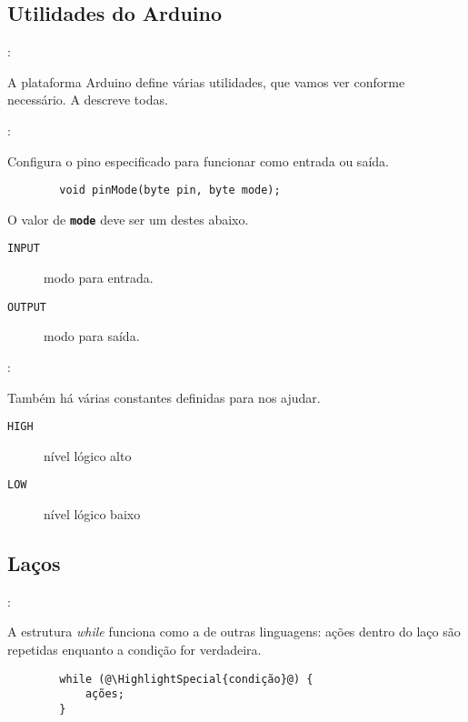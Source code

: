 \subsection{Utilidades do Arduino}


\begin{frame}{\insertsection: \insertsubsection}

	A plataforma Arduino define várias utilidades, que vamos ver conforme necessário. A  descreve todas.

\end{frame}


\begin{frame}[fragile]{\insertsection: \insertsubsection}

	Configura o pino especificado para funcionar como entrada ou saída.
	\begin{verbatim}
		void pinMode(byte pin, byte mode);
	\end{verbatim}

	O valor de \texttt{\textbf{mode}} deve ser um destes abaixo.
	\begin{description}
		\item[\texttt{INPUT}] modo para entrada.
		\item[\texttt{OUTPUT}] modo para saída.
	\end{description}

\end{frame}


\begin{frame}{\insertsection: \insertsubsection}

	Também há várias constantes definidas para nos ajudar.
	\begin{description}
		\item[\texttt{HIGH}] nível lógico alto
		\item[\texttt{LOW}] nível lógico baixo
	\end{description}

\end{frame}


\subsection{Laços}


\begin{frame}[fragile]{\insertsection: \insertsubsection}

	A estrutura \textit{while} funciona como a de outras linguagens: ações dentro do laço são repetidas enquanto a condição for verdadeira.
	\begin{verbatim}
		while (@\HighlightSpecial{condição}@) {
			ações;
		}
	\end{verbatim}

\end{frame}


